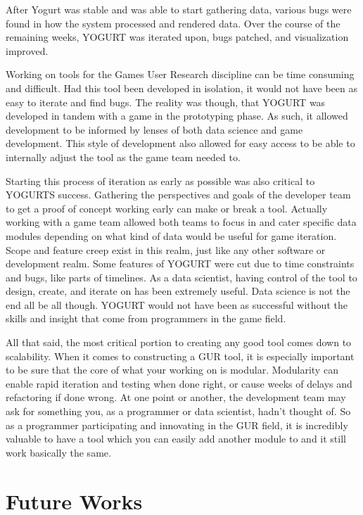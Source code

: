 \documentclass[journal]{IEEEtran}
\begin{document}
After Yogurt was stable and was able to start gathering data, various bugs were found in how the system processed and rendered data. Over the course of the remaining weeks, YOGURT was iterated upon, bugs patched, and visualization improved.

Working on tools for the Games User Research discipline can be time consuming and difficult. Had this tool been developed in isolation, it would not have been as easy to iterate and find bugs. The reality was though, that YOGURT was developed in tandem with a game in the prototyping phase. As such, it allowed development to be informed by lenses of both data science and game development. This style of development also allowed for easy access to be able to internally adjust the tool as the game team needed to.

Starting this process of iteration as early as possible was also critical to YOGURTS success. Gathering the perspectives and goals of the developer team to get a proof of concept working early can make or break a tool. Actually working with a game team allowed both teams to focus in and cater specific data modules depending on what kind of data would be useful for game iteration. Scope and feature creep exist in this realm, just like any other software or development realm. Some features of YOGURT were cut due to time constraints and bugs, like parts of timelines. As a data scientist, having control of the tool to design, create, and iterate on has been extremely useful. Data science is not the end all be all though. YOGURT would not have been as successful without the skills and insight that come from programmers in the game field.

All that said, the most critical portion to creating any good tool comes down to scalability. When it comes to constructing a GUR tool, it is especially important to be sure that the core of what your working on is modular. Modularity can enable rapid iteration and testing when done right, or cause weeks of delays and refactoring if done wrong. At one point or another, the development team may ask for something you, as a programmer or data scientist, hadn’t thought of. So as a programmer participating and innovating in the GUR field, it is incredibly valuable to have a tool which you can easily add another module to and it still work basically the same.

\section{Future Works}
\end{document}
